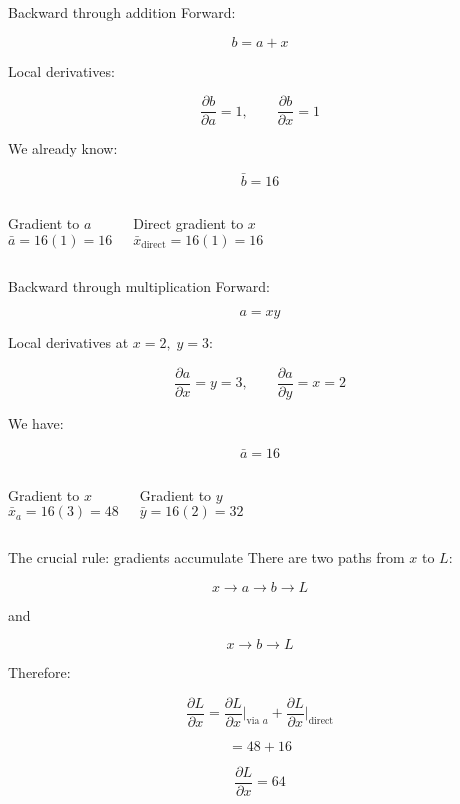\documentclass[10pt,aspectratio=169]{beamer}
\newcommand{\grad}[2]{\frac{\partial #1}{\partial #2}}
\newcommand{\adj}[1]{\bar{#1}}
\begin{document}
\begin{frame}[t]{Backward through addition}
Forward:

\[
b=a+x
\]

Local derivatives:

\[
\grad{b}{a}=1,
\qquad
\grad{b}{x}=1
\]

We already know:

\[
\adj{b}=16
\]

\begin{columns}[T]
\begin{block}{Gradient to \(a\)}
\[
\adj{a}=16(1)=16
\]
\end{block}

\begin{block}{Direct gradient to \(x\)}
\[
\adj{x}_{\text{direct}}=16(1)=16
\]
\end{block}
\end{columns}
\end{frame}

\begin{frame}[t]{Backward through multiplication}
Forward:

\[
a=xy
\]

Local derivatives at \(x=2,\;y=3\):

\[
\grad{a}{x}=y=3,
\qquad
\grad{a}{y}=x=2
\]

We have:

\[
\adj{a}=16
\]

\begin{columns}[T]
\begin{block}{Gradient to \(x\)}
\[
\adj{x}_{a}=16(3)=48
\]
\end{block}

\begin{block}{Gradient to \(y\)}
\[
\adj{y}=16(2)=32
\]
\end{block}
\end{columns}
\end{frame}

\begin{frame}[t]{The crucial rule: gradients accumulate}
There are two paths from \(x\) to \(L\):

\[
x\rightarrow a\rightarrow b\rightarrow L
\]

and

\[
x\rightarrow b\rightarrow L
\]

Therefore:

\[
\grad{L}{x}
=
\grad{L}{x}\bigg|_{\text{via }a}
+
\grad{L}{x}\bigg|_{\text{direct}}
\]

\[
=48+16
\]

\[
\boxed{\grad{L}{x}=64}
\]
\end{frame}
\end{document}
